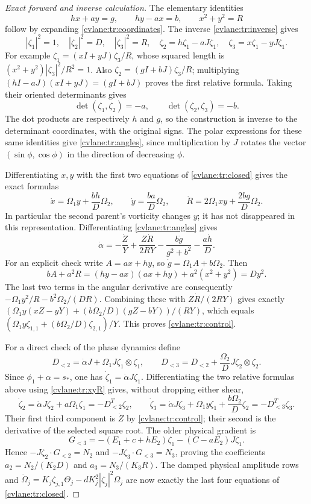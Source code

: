 \begin{proof}[Exact forward and inverse calculation]
The elementary identities
\[
 hx+ay=g,\qquad hy-ax=b,\qquad x^2+y^2=R
\]
follow by expanding \eqref{cvlane:tr:coordinates}. The inverse
\eqref{cvlane:tr:inverse} gives
\[
 |\zeta_1|^2=1,\quad |\zeta_2|^2=D,\quad
 |\zeta_3|^2=R,\quad
 \zeta_2=h\zeta_1-aJ\zeta_1,\quad
 \zeta_3=x\zeta_1-yJ\zeta_1.
\]
For example $\zeta_1=(xI+yJ)\zeta_3/R$, whose squared
length is $(x^2+y^2)|\zeta_3|^2/R^2=1$.
Also $\zeta_2=(gI+bJ)\zeta_3/R$; multiplying
$(hI-aJ)(xI+yJ)=(gI+bJ)$ proves the first relative formula.
Taking their oriented determinants gives
\[
 \det(\zeta_1,\zeta_2)=-a,\qquad
 \det(\zeta_2,\zeta_3)=-b.
\]
The dot products are respectively $h$ and $g$, so the construction
is inverse to the determinant coordinates, with the original signs.
The polar expressions for these same identities give
\eqref{cvlane:tr:angles}, since multiplication by $J$ rotates the vector
$(\sin\phi,\cos\phi)$ in the direction of decreasing $\phi$.

Differentiating $x,y$ with the first two equations of
\eqref{cvlane:tr:closed} gives the exact formulas
\begin{equation}\label{cvlane:tr:xyR}
 \dot x=\Omega_1y+\frac{bh}{D}\Omega_2,
 \qquad \dot y=\frac{ba}{D}\Omega_2,
 \qquad \dot R=2\Omega_1xy+\frac{2bg}{D}\Omega_2.
\end{equation}
In particular the second parent's vorticity changes $y$; it has
not disappeared in this representation. Differentiating
\eqref{cvlane:tr:angles} gives
\[
 \dot\alpha=-\frac{\dot Z}{Y}
       +\frac{Z\dot R}{2RY}
       -\frac{b\dot g}{g^2+b^2}-\frac{a\dot h}{D}.
\]
For an explicit check write $A=ax+hy$, so
$\dot g=\Omega_1A+b\Omega_2$. Then
\[
 bA+a^2R=(hy-ax)(ax+hy)+a^2(x^2+y^2)=Dy^2.
\]
The last two terms in the angular derivative are consequently
$-\Omega_1y^2/R-b^2\Omega_2/(DR)$.
Combining these with $Z\dot R/(2RY)$ gives exactly
$(\Omega_1y(xZ-yY)+(b\Omega_2/D)(gZ-bY))/(RY)$,
which equals
$(\Omega_1y\zeta_{1,1}+(b\Omega_2/D)\zeta_{2,1})/Y$.
This proves \eqref{cvlane:tr:control}.

For a direct check of the phase dynamics define
\[
 D_{<2}=\dot\alpha J+
       \Omega_1J\zeta_1\otimes\zeta_1,\qquad
 D_{<3}=D_{<2}+\frac{\Omega_2}{D}
                         J\zeta_2\otimes\zeta_2.
\]
Since $\phi_1+\alpha=s_*$, one has
$\dot\zeta_1=\dot\alpha J\zeta_1$.
Differentiating the two relative formulas above using
\eqref{cvlane:tr:xyR} gives, without dropping either shear,
\[
 \dot\zeta_2=\dot\alpha J\zeta_2+a\Omega_1\zeta_1
             =-D_{<2}^T\zeta_2,
 \qquad
 \dot\zeta_3=\dot\alpha J\zeta_3+\Omega_1y\zeta_1
                   +\frac{b\Omega_2}{D}\zeta_2
             =-D_{<3}^T\zeta_3.
\]
Their first third component is $\dot Z$ by
\eqref{cvlane:tr:control}; their second is the derivative of the selected
square root. The older physical gradient is
\[
 G_{<3}=-(E_1+c+hE_2)\zeta_1-(C-aE_2)J\zeta_1.
\]
Hence $-J\zeta_2\cdot G_{<2}=N_2$ and
$-J\zeta_3\cdot G_{<3}=N_3$, proving the coefficients
$a_2=N_2/(K_2D)$ and $a_3=N_3/(K_3R)$.
The damped physical amplitude rows and
$\dot\Omega_j=K_j\zeta_{j,1}\Theta_j-dK_j^2|\zeta_j|^2\Omega_j$
are now exactly the last four equations of \eqref{cvlane:tr:closed}.


\end{proof}
